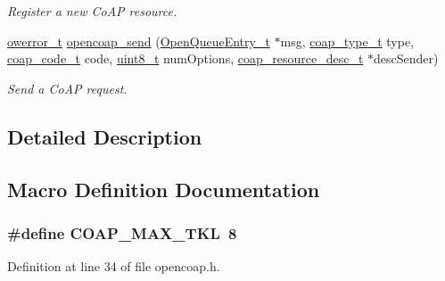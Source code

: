 \begin{DoxyCompactItemize}
\begin{DoxyCompactList}\small\item\em Register a new Co\+AP resource. \end{DoxyCompactList}\item 
\hyperlink{opendefs_8h_af20b7c3ed9d2ba19e56a309ad9314803}{owerror\+\_\+t} \hyperlink{group__open_coap_gaa4a1f14228086a934a38230eb0254323}{opencoap\+\_\+send} (\hyperlink{struct_open_queue_entry__t}{Open\+Queue\+Entry\+\_\+t} $\ast$msg, \hyperlink{group__open_coap_gafb608e0d646391b17d00513242200087}{coap\+\_\+type\+\_\+t} type, \hyperlink{group__open_coap_gae99fde61d59e68af70c6bcd0c7b0256f}{coap\+\_\+code\+\_\+t} code, \hyperlink{_p_e___types_8h_aba7bc1797add20fe3efdf37ced1182c5}{uint8\+\_\+t} num\+Options, \hyperlink{structcoap__resource__desc__t}{coap\+\_\+resource\+\_\+desc\+\_\+t} $\ast$desc\+Sender)
\begin{DoxyCompactList}\small\item\em Send a Co\+AP request. \end{DoxyCompactList}\end{DoxyCompactItemize}


\subsection{Detailed Description}


\subsection{Macro Definition Documentation}
\subsubsection[{\texorpdfstring{C\+O\+A\+P\+\_\+\+M\+A\+X\+\_\+\+T\+KL}{COAP_MAX_TKL}}]{\setlength{\rightskip}{0pt plus 5cm}\#define C\+O\+A\+P\+\_\+\+M\+A\+X\+\_\+\+T\+KL~8}\hypertarget{group__open_coap_gac74ba1d96b0defa127ca13247884a8d4}{}\label{group__open_coap_gac74ba1d96b0defa127ca13247884a8d4}


Definition at line 34 of file opencoap.\+h.

